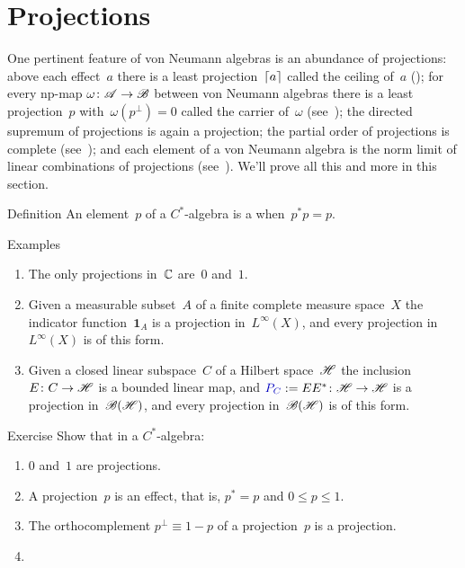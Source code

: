 \documentclass[a]{subfiles}
\begin{document}
\section{Projections}
\begin{parsec}%
\begin{point}%
One pertinent feature
of von Neumann algebras
is an abundance of projections:
above each effect~$a$ 
there is a least projection~$\left\lceil a\right\rceil$
called the ceiling of~$a$ ();
for every np-map $\omega\colon \mathscr{A}\to \mathscr{B}$
between von Neumann algebras
there is a least projection~$p$ with~$\omega(p^\perp)=0$
called the carrier of~$\omega$ (see~);
the directed supremum of projections is again a projection;
the partial order of projections is complete
(see~);
and each element of a von Neumann algebra is the norm limit
of linear combinations of projections
(see~).
We'll prove all this and more in this section.
\end{point}
\begin{point}{Definition}%
An element~$p$ of a $C^*$-algebra
is a 
when~$p^*p=p$.
\end{point}
\begin{point}{Examples}%
\begin{enumerate}
\item
The only projections in~$\mathbb{C}$ are~$0$ and~$1$.
\item
Given a measurable
subset~$A$ of a finite complete measure space~$X$
the indicator function~$\mathbf{1}_A$
is a projection in~$L^\infty(X)$,
and every projection in~$L^\infty(X)$
is of this form.
\item
Given a closed linear subspace~$C$ of a Hilbert space~$\mathscr{H}$
the inclusion $E\colon C\to \mathscr{H}$
is a bounded linear map,
and  $\Define{P_C}:=EE^*\colon \scrH\to\scrH$
is a projection in~$\mathscr{B}(\mathscr{H})$,
and
every projection in~$\mathscr{B}(\mathscr{H})$ is of this form.
\end{enumerate}
\end{point}
\begin{point}{Exercise}%
Show that in a $C^*$-algebra:
\begin{enumerate}
\item
$0$ and~$1$ are projections.
\item
A projection~$p$ is an effect,
that is, $p^*=p$
and $0\leq p\leq 1$.
\item
The orthocomplement $p^\perp \equiv 1-p$ of a projection~$p$
is a projection.
\item

\end{enumerate}
\end{point}
\end{parsec}
\end{document}
